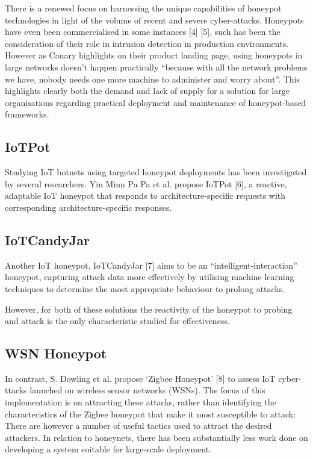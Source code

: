 
There is a renewed focus on harnessing the unique capabilities of honeypot technologies in light of
the volume of recent and severe cyber-attacks. Honeypots have even been commercialised in some instances [4] [5], such has been the consideration of their role in intrusion detection in production environments. However as Canary highlights on their product landing page, using honeypots in large networks doesn’t happen practically “because with all the network problems we have, nobody needs one more machine to administer and worry about”. This highlights clearly both the demand  and lack of supply for a solution for large organisations regarding practical deployment and  maintenance of honeypot-based frameworks. 

\subsection{IoTPot}

Studying IoT botnets using targeted honeypot deployments has been investigated by several  researchers. Yin Minn Pa Pa et al. propose IoTPot [6], a reactive, adaptable IoT honeypot that responds to architecture-specific  requests with corresponding architecture-specific responses. 

\subsection{IoTCandyJar}

Another IoT honeypot, IoTCandyJar [7] aims to be an “intelligent-interaction” honeypot, capturing attack data more effectively by utilising machine learning techniques to determine the most appropriate behaviour to prolong attacks. 

However, for both of these solutions the reactivity of the honeypot to probing and attack is the only characteristic studied for effectiveness. 

\subsection{WSN Honeypot}

In contrast, S. Dowling et al. propose ‘Zigbee Honeypot’ [8] to assess IoT cyber- ttacks launched on wireless sensor networks (WSNs). The focus of this implementation is on attracting these attacks, rather than  identifying the characteristics of the Zigbee honeypot that make it most susceptible to attack: There are however a number of useful tactics used to attract the desired attackers. In relation to honeynets, there has been substantially less work done on developing a system suitable for large-scale deployment. 

